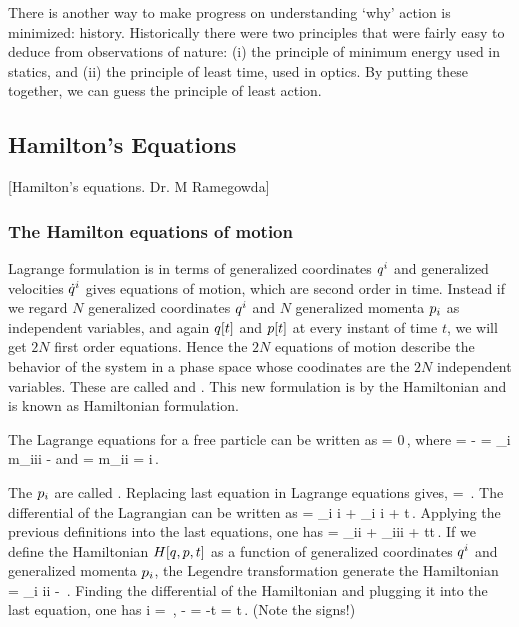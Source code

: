 There is another way to make progress on understanding `why' action is minimized: history. Historically there were two principles that were fairly easy to deduce from observations of nature: (i) the principle of minimum energy used in statics, and (ii) the principle of least time, used in optics. By putting these together, we can guess the principle of least action.


\subsection{Hamilton's Equations}
[Hamilton's equations. Dr. M Ramegowda]


\subsubsection{The Hamilton equations of motion}
Lagrange formulation is in terms of generalized coordinates ${q}^{i}$ and generalized velocities ${\dot{q}}^{i}$ gives equations of motion, which are second order in time. Instead if we regard $N$ generalized coordinates ${q}^{i}$ and $N$ generalized momenta ${p}_{i}$ as independent variables, and again $q\!\left[{t}\right]$ and $p\!\left[{t}\right]$ at every instant of time $t$, we will get $2N$ first order equations. Hence the $2N$ equations of motion describe the behavior of the system in a phase space whose coodinates are the $2N$ independent variables. These are called  and . This new formulation is by the Hamiltonian and is known as Hamiltonian formulation.

The Lagrange equations for a free particle can be written as
\beq
{} = 0\,,
\eeq
where 
\beq
\lag{} = \ken - \pen = \sum_i m_i\gvel i\gvel i - \pen
\eeq
and
\beq
{} = m_i\gvel i = \gmom i\,.
\eeq

The ${p}_{i}$ are called . Replacing last equation in Lagrange equations gives,
\beq
{} = \,.
\eeq
The differential of the Lagrangian can be written as
\beq
\dx\lag = \sum_i \dx\gpos i 
          + \sum_i \dx\gvel i
          + \dx t\,.
\eeq
Applying the previous definitions into the last equations, one has
\beq
\dx\lag = \sum_i\dx\gpos i 
          + \sum_i\gmom i\dx\gvel i 
          + \xpd\lag t\dx t\,.
\eeq
If we define the Hamiltonian $H\!\left[{q, p, t}\right]$ as a function of generalized coordinates ${q}^{i}$ and generalized momenta ${p}_{i}$, the Legendre transformation generate the Hamiltonian
\beq
\ham{} = \sum_i \gvel i\gmom i - \lag{}\,.
\eeq
Finding the differential of the Hamiltonian and plugging it into the last equation, one has
\beq
      \gvel i = \,,\qquad
- = \qquad{}\qquad
  -\xpd\lag t = \xpd\ham t\,.
\eeq
(Note the signs!)

